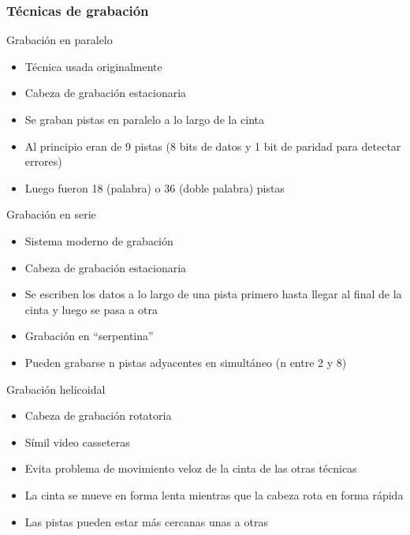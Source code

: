 \subsubsection{Técnicas de grabación}
	Grabación en paralelo
		\begin{itemize}
		\item Técnica usada originalmente
		\item Cabeza de grabación estacionaria
		\item Se graban pistas en paralelo a lo largo de la cinta
		\item Al principio eran de 9 pistas (8 bits de datos y 1 bit de paridad para detectar errores)
		\item Luego fueron 18 (palabra) o 36 (doble palabra) pistas
		\end{itemize}
	Grabación en serie
		\begin{itemize}
		\item Sistema moderno de grabación
		\item Cabeza de grabación estacionaria
		\item Se escriben los datos a lo largo de una pista primero hasta llegar al final de la cinta y luego se pasa a otra
		\item Grabación en “serpentina”
		\item Pueden grabarse n pistas adyacentes en simultáneo (n entre 2 y 8)
		\end{itemize}
	Grabación helicoidal
		\begin{itemize}
		\item Cabeza de grabación rotatoria
		\item Símil video casseteras
		\item Evita problema de movimiento veloz de la cinta de las otras técnicas
		\item La cinta se mueve en forma lenta mientras que la cabeza rota en forma rápida
		\item Las pistas pueden estar más cercanas unas a otras
		\end{itemize}

